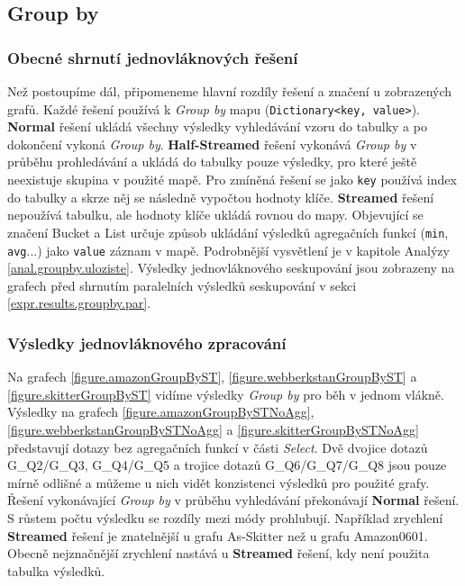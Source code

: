 \subsection{Group by}

\subsubsection{Obecné shrnutí jednovláknových řešení}

Než postoupíme dál, připomeneme hlavní rozdíly řešení a značení u zobrazených grafů. 
Každé řešení používá k \textit{Group by} mapu (\verb+Dictionary<key, value>+).
\textbf{Normal} řešení ukládá všechny výsledky vyhledávání vzoru do tabulky a po dokončení vykoná \textit{Group by}. 
\textbf{Half-Streamed} řešení vykonává \textit{Group by} v průběhu prohledávání a ukládá do tabulky pouze výsledky, pro které ještě neexistuje skupina v použité mapě.
Pro zmíněná řešení se jako \verb+key+ používá index do tabulky a skrze něj se následně vypočtou hodnoty klíče.
\textbf{Streamed} řešení nepoužívá tabulku, ale hodnoty klíče ukládá rovnou do mapy. 
Objevující se značení Bucket a List určuje způsob ukládání výsledků agregačních funkcí (\verb+min+, \verb+avg+...) jako \verb+value+ záznam v mapě.
Podrobnější vysvětlení je v kapitole Analýzy \ref{anal.groupby.uloziste}.
Výsledky jednovláknového seskupování jsou zobrazeny na grafech před shrnutím paralelních výsledků seskupování v sekci \ref{expr.results.groupby.par}.

\subsubsection{Výsledky jednovláknového zpracování}

Na grafech \ref{figure.amazonGroupByST}, \ref{figure.webberkstanGroupByST} a \ref{figure.skitterGroupByST} vidíme výsledky \textit{Group by} pro běh v jednom vlákně.
Výsledky na grafech \ref{figure.amazonGroupBySTNoAgg}, \ref{figure.webberkstanGroupBySTNoAgg} a \ref{figure.skitterGroupBySTNoAgg} představují dotazy bez agregačních funkcí v části \textit{Select}.
Dvě dvojice dotazů G\_Q2/G\_Q3, G\_Q4/G\_Q5 a trojice dotazů G\_Q6/G\_Q7/G\_Q8 jsou pouze mírně odlišné a můžeme u nich vidět konzistenci výsledků pro použité grafy.
Řešení vykonávající \textit{Group by} v průběhu vyhledávání překonávají \textbf{Normal} řešení.
S růstem počtu výsledku se rozdíly mezi módy prohlubují. 
Například zrychlení \textbf{Streamed} řešení je znatelnější u grafu As-Skitter než u grafu Amazon0601. 
Obecně nejznačnější zrychlení nastává u \textbf{Streamed} řešení, kdy není použita tabulka výsledků.

